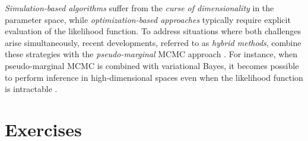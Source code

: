\textit{Simulation-based algorithms} suffer from the \textit{curse of dimensionality} in the parameter space, while \textit{optimization-based approaches} typically require explicit evaluation of the likelihood function. To address situations where both challenges arise simultaneously, recent developments, referred to as \textit{hybrid methods}, combine these strategies with the \textit{pseudo-marginal} MCMC approach \cite{andrieu2009pseudoefficient, martin2024approximating}. For instance, when pseudo-marginal MCMC is combined with variational Bayes, it becomes possible to perform inference in high-dimensional spaces even when the likelihood function is intractable \cite{tran2017variational}.  

\section{Exercises}\label{sec15_4}

